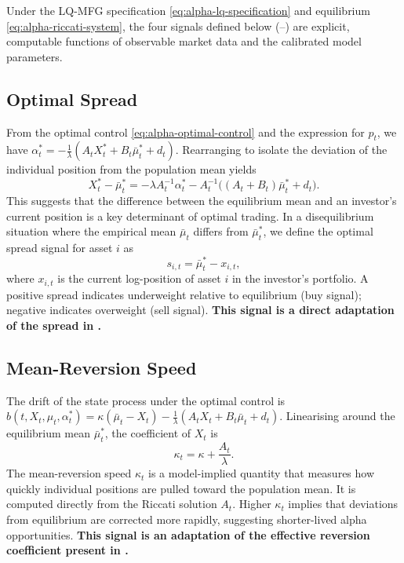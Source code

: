 \begin{proposition}
\label{prop:alpha-signals}
Under the LQ-MFG specification \eqref{eq:alpha-lq-specification} and equilibrium
\eqref{eq:alpha-riccati-system}, the four signals defined below
(--) are explicit, computable
functions of observable market data and the calibrated model parameters.
\end{proposition}

\subsection{Optimal Spread}
\label{sec:alpha-spread}

From the optimal control \eqref{eq:alpha-optimal-control} and the expression for
$p_t$, we have $\alpha_t^* = -\frac{1}{\lambda}(A_t X_t^* + B_t \bar\mu_t^* + d_t)$.
Rearranging to isolate the deviation of the individual position from the population
mean yields
\[
    X_t^* - \bar\mu_t^* = -\lambda A_t^{-1} \alpha_t^* - A_t^{-1}\big( (A_t + B_t)
    \bar\mu_t^* + d_t \big).
\]
This suggests that the difference between the equilibrium mean and an investor's
current position is a key determinant of optimal trading. In a disequilibrium
situation where the empirical mean $\bar\mu_t$ differs from $\bar\mu_t^*$, we define
the optimal spread signal for asset $i$ as
\begin{equation}
    s_{i,t} = \bar\mu_t^* - x_{i,t},
    \label{eq:alpha-spread}
\end{equation}
where $x_{i,t}$ is the current log-position of asset $i$ in the investor's
portfolio. A positive spread indicates underweight relative to equilibrium (buy
signal); negative indicates overweight (sell signal). \textbf{This signal is a
direct adaptation of the spread in \citep{cardaliaguetlehalle2018}.}

\subsection{Mean-Reversion Speed}
\label{sec:alpha-reversion}

The drift of the state process under the optimal control is
$b(t,X_t,\mu_t,\alpha_t^*) = \kappa(\bar\mu_t - X_t) - \frac{1}{\lambda}(A_t X_t +
B_t \bar\mu_t + d_t)$. Linearising around the equilibrium mean $\bar\mu_t^*$, the
coefficient of $X_t$ is
\begin{equation}
    \kappa_t = \kappa + \frac{A_t}{\lambda}.
    \label{eq:alpha-mean-reversion-speed}
\end{equation}
The mean-reversion speed $\kappa_t$ is a model-implied quantity that measures how
quickly individual positions are pulled toward the population mean. It is computed
directly from the Riccati solution $A_t$. Higher $\kappa_t$ implies that deviations
from equilibrium are corrected more rapidly, suggesting shorter-lived alpha
opportunities. \textbf{This signal is an adaptation of the effective reversion
coefficient present in \citep{lehallemouzouni2019}.}

